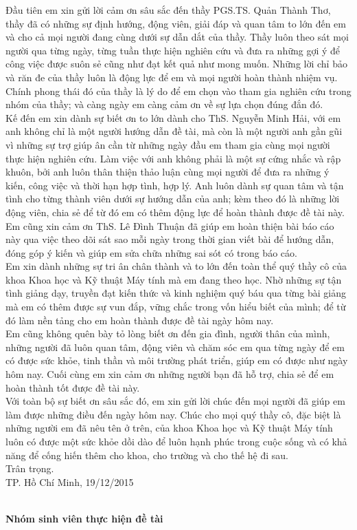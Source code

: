 Đầu tiên em xin gửi lời cảm ơn sâu sắc đến thầy PGS.TS. Quản Thành Thơ, thầy đã có những sự định hướng, động viên, giải đáp và quan tâm to lớn đến em và cho cả mọi người đang cùng dưới sự dẫn dắt của thầy. Thầy luôn theo sát mọi người qua từng ngày, từng tuần thực hiện nghiên cứu và đưa ra những gợi ý để công việc được suôn sẻ cũng như đạt kết quả như mong muốn. Những lời chỉ bảo và răn đe của thầy luôn là động lực để em và mọi người hoàn thành nhiệm vụ. Chính phong thái đó của thầy là lý do để em chọn vào tham gia nghiên cứu trong nhóm của thầy; và càng ngày em càng cảm ơn về sự lựa chọn đúng đắn đó.\\

Kế đến em xin dành sự biết ơn to lớn dành cho ThS. Nguyễn Minh Hải, với em anh không chỉ là một người hướng dẫn đề tài, mà còn là một người anh gần gũi vì những sự trợ giúp ân cần từ những ngày đầu em tham gia cùng mọi người thực hiện nghiên cứu. Làm việc với anh không phải là một sự cứng nhắc và rập khuôn, bởi anh luôn thân thiện thảo luận cùng mọi người để đưa ra những ý kiến, công việc và thời hạn hợp tình, hợp lý. Anh luôn dành sự quan tâm và tận tình cho từng thành viên dưới sự hướng dẫn của anh; kèm theo đó là những lời động viên, chia sẻ để từ đó em có thêm động lực để hoàn thành được đề tài này.\\

Em cũng xin cảm ơn ThS. Lê Đình Thuận đã giúp em hoàn thiện bài báo cáo này qua việc theo dõi sát sao mỗi ngày trong thời gian viết bài để hướng dẫn, đóng góp ý kiến và giúp em sửa chữa những sai sót có trong báo cáo.\\

Em xin dành những sự tri ân chân thành và to lớn đến toàn thể quý thầy cô của khoa Khoa học và Kỹ thuật Máy tính mà em đang theo học. Nhờ những sự tận tình giảng dạy, truyền đạt kiến thức và kinh nghiệm quý báu qua từng bài giảng mà em có thêm được sự vun đắp, vững chắc trong vốn hiểu biết của mình; để từ đó làm nền tảng cho em hoàn thành được đề tài ngày hôm nay.\\

Em cũng không quên bày tỏ lòng biết ơn đến gia đình, người thân của mình, những người đã luôn quan tâm, động viên và chăm sóc em qua từng ngày để em có được sức khỏe, tinh thần và môi trường phát triển, giúp em có được như ngày hôm nay. Cuối cùng em xin cảm ơn những người bạn đã hỗ trợ, chia sẻ để em hoàn thành tốt được đề tài này.\\

Với toàn bộ sự biết ơn sâu sắc đó, em xin gửi lời chúc đến mọi người đã giúp em làm được những điều đến ngày hôm nay. Chúc cho mọi quý thầy cô, đặc biệt là những người em đã nêu tên ở trên, của khoa Khoa học và Kỹ thuật Máy tính luôn có được một sức khỏe dồi dào để luôn hạnh phúc trong cuộc sống và có khả năng để cống hiến thêm cho khoa, cho trường và cho thế hệ đi sau.\\

Trân trọng.\\

TP. Hồ Chí Minh, 19/12/2015\\\\

\hspace{5cm}
\begin{minipage}[t]{0.60\linewidth}
	\begin{center}
		\textbf{Nhóm sinh viên thực hiện đề tài}\\
	\end{center}
\end{minipage}

